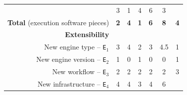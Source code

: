 \documentclass[preprint,3p,twocolumn]{elsarticle}
\begin{document}
\begin{table}
\begin{tabular}{rcccccc}
                                     & \cellcolor[HTML]{99D699}3
                                     & \cellcolor[HTML]{99FF99}1
                                     & \cellcolor[HTML]{99C299}4
                                     & \cellcolor[HTML]{999999}6
                                     & \cellcolor[HTML]{99D699}3\\
  \textbf{Total} (execution software pieces)& \cellcolor[HTML]{99F099}\textbf{2}
                                     & \cellcolor[HTML]{99D399}\textbf{4}
                                     & \cellcolor[HTML]{99FF99}\textbf{1}
                                     & \cellcolor[HTML]{99B699}\textbf{6}
                                     & \cellcolor[HTML]{999999}\textbf{8}
                                     & \cellcolor[HTML]{99D399}\textbf{4}\\
\cellcolor[HTML]{EEEEEE}\textbf{Extensibility}& \multicolumn{6}{l}{\cellcolor[HTML]{EEEEEE}}\\
  New engine type -- \texttt{E$_1$}  & \cellcolor[HTML]{99C599}3
                                     & \cellcolor[HTML]{99A899}4
                                     & \cellcolor[HTML]{99E299}2
                                     & \cellcolor[HTML]{99C599}3
                                     & \cellcolor[HTML]{999999}4.5
                                     & \cellcolor[HTML]{99FF99}1\\
New engine version -- \texttt{E$_2$} & \cellcolor[HTML]{999999}1
                                     & \cellcolor[HTML]{99FF99}0
                                     & \cellcolor[HTML]{999999}1
                                     & \cellcolor[HTML]{99FF99}0
                                     & \cellcolor[HTML]{99FF99}0
                                     & \cellcolor[HTML]{999999}1\\
  New workflow -- \texttt{E$_3$} & \cellcolor[HTML]{99FF99}2
                                     & \cellcolor[HTML]{99FF99}2
                                     & \cellcolor[HTML]{99FF99}2
                                     & \cellcolor[HTML]{99FF99}2
                                     & \cellcolor[HTML]{99FF99}2
                                     & \cellcolor[HTML]{999999}3\\
New infrastructure -- \texttt{E$_4$} & \cellcolor[HTML]{99DD99}4
                                     & \cellcolor[HTML]{99DD99}4
                                     & \cellcolor[HTML]{99FF99}3
                                     & \cellcolor[HTML]{99DD99}4
                                     & \cellcolor[HTML]{999999}6

\end{tabular}
\end{table}
\end{document}
